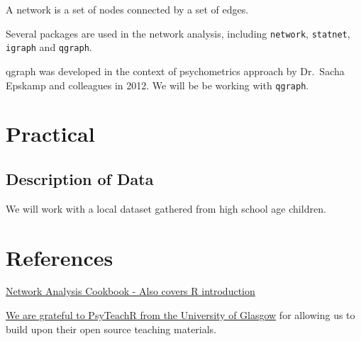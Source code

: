 \documentclass[]{book}
\begin{document}
A network is a set of nodes connected by a set of edges.

Several packages are used in the network analysis, including
\texttt{network}, \texttt{statnet}, \texttt{igraph} and \texttt{qgraph}.

qgraph was developed in the context of psychometrics approach by
Dr.~Sacha Epskamp and colleagues in 2012. We will be be working with
\texttt{qgraph}.

\chapter{Practical}\label{practical}

\section{Description of Data}\label{description-of-data}

We will work with a local dataset gathered from high school age
children.

\appendix


\chapter{References}\label{references}

\href{http://sachaepskamp.com/files/Cookbook.html}{Network Analysis
Cookbook - Also covers R introduction}

\href{https://psyteachr.github.io/}{We are grateful to PsyTeachR from
the University of Glasgow} for allowing us to build upon their open
source teaching materials.


\end{document}
